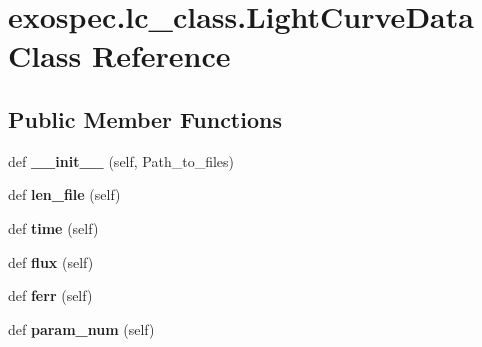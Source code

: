 \hypertarget{classexospec_1_1lc__class_1_1_light_curve_data}{}\section{exospec.\+lc\+\_\+class.\+Light\+Curve\+Data Class Reference}
\label{classexospec_1_1lc__class_1_1_light_curve_data}
\subsection*{Public Member Functions}
\begin{DoxyCompactItemize}
\item 
\mbox{\label{classexospec_1_1lc__class_1_1_light_curve_data_ae1113e4e3550f87c8d4339af1c8d1b6e}} 
def {\bfseries \+\_\+\+\_\+init\+\_\+\+\_\+} (self, Path\+\_\+to\+\_\+files)
\item 
\mbox{\label{classexospec_1_1lc__class_1_1_light_curve_data_a33061fe920777987d5cc9936bd112d9e}} 
def {\bfseries len\+\_\+file} (self)
\item 
\mbox{\label{classexospec_1_1lc__class_1_1_light_curve_data_ad216feba69b805a0732a43555354c76d}} 
def {\bfseries time} (self)
\item 
\mbox{\label{classexospec_1_1lc__class_1_1_light_curve_data_a99a2aa168565aa5e6a0b2ec95aa92cff}} 
def {\bfseries flux} (self)
\item 
\mbox{\label{classexospec_1_1lc__class_1_1_light_curve_data_a4d3d200dc5af76cdd33f610c12ebba83}} 
def {\bfseries ferr} (self)
\item 
\mbox{\label{classexospec_1_1lc__class_1_1_light_curve_data_a352d1d2bd0496d7117546a29b2c7cb34}} 
def {\bfseries param\+\_\+num} (self)
\item 
\mbox{\label{classexospec_1_1lc__class_1_1_light_curve_data_a515e685cc89aae396dc37212cff2e94b}} 

\end{DoxyCompactItemize}
